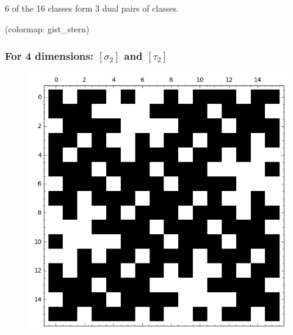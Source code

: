 \documentclass[pdf,sprung,slideColor,nocolorBG]{beamer}
\newenvironment{colortheme}[1]{
\def\ProvidesPackageRCS $##1${\relax}
\renewcommand{\ProcessOptions}{\relax}
\makeatletter

\makeatother
}{}
\newcommand{\slidecite}[1]{\tiny{(#1)}\normalsize{}}
\begin{document}
\begin{colortheme}{jubata}
\begin{frame}
\begin{figure}
\begin{minipage}{.48\textwidth}
  \label{fig:psf_9_5439_dual_cayley_graph_index_matrix}
\end{minipage}%
\end{figure}
6 of the 16 classes form 3 dual pairs of classes.

\slidecite{colormap: gist\_stern}
\end{frame}

\end{colortheme}

\begin{colortheme}{jubata}

\begin{frame}
\frametitle{For 4 dimensions: $[\sigma_2]$ and $[\tau_2]$}
\begin{figure}
\centering
\begin{minipage}{.48\textwidth}
  \centering
  \includegraphics[width=.9\linewidth]{../matrix_plot/sigma_2_bent_cayley_graph_index_matrix.png}
  \label{fig:sigma_2_bent_cayley_graph_index_matrix}
\end{minipage}%
\begin{minipage}{.48\textwidth}
  \centering

\end{minipage}
\end{figure}
\end{frame}
\end{colortheme}
\end{document}
